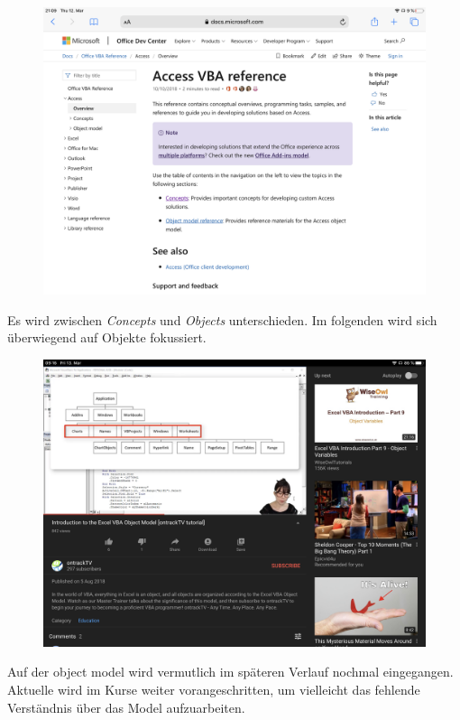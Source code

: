 \begin{figure}[H]
	\centering
	\includegraphics[scale = 0.3]{attachment/chapter_2/Scc019}
	\caption{}
	\label{fig:Scc019}
\end{figure} 
Es wird zwischen \textit{Concepts} und \textit{Objects} unterschieden. Im folgenden wird sich überwiegend auf Objekte fokussiert.


\begin{figure}[H]
	\centering
	\includegraphics[scale = 0.3]{attachment/chapter_2/Scc020}
	\caption{}
	\label{fig:Scc020}
\end{figure} 
Auf der object model wird vermutlich im späteren Verlauf nochmal eingegangen. Aktuelle wird im Kurse weiter vorangeschritten, um vielleicht das fehlende Verständnis über das Model aufzuarbeiten. 
